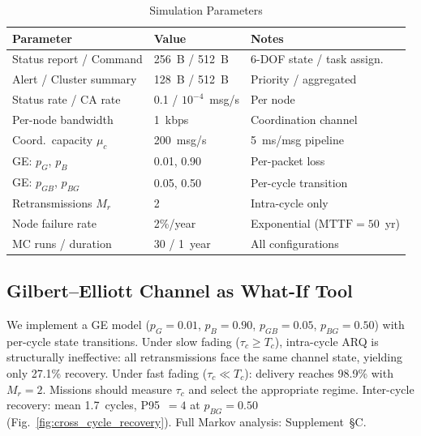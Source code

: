 \documentclass[journal]{IEEEtran}
\begin{document}
\begin{table}[t]
    \centering
    \caption{Simulation Parameters}
    \label{tab:sim_params}
    \footnotesize
    \begin{tabular}{@{}lll@{}}
        \toprule
        \textbf{Parameter} & \textbf{Value} & \textbf{Notes} \\
        \midrule
        Status report / Command & 256~B / 512~B & 6-DOF state / task assign. \\
        Alert / Cluster summary & 128~B / 512~B & Priority / aggregated \\
        Status rate / CA rate & 0.1 / $10^{-4}$~msg/s & Per node \\
        Per-node bandwidth & 1~kbps & Coordination channel \\
        Coord.\ capacity $\mu_c$ & 200~msg/s & 5~ms/msg pipeline \\
        \midrule
        GE: $p_G$, $p_B$ & 0.01, 0.90 & Per-packet loss \\
        GE: $p_{GB}$, $p_{BG}$ & 0.05, 0.50 & Per-cycle transition \\
        Retransmissions $M_r$ & 2 & Intra-cycle only \\
        \midrule
        Node failure rate & 2\%/year & Exponential ($\text{MTTF} = 50$~yr) \\
        MC runs / duration & 30 / 1~year & All configurations \\
        \bottomrule
    \end{tabular}
\end{table}

\subsection{Gilbert--Elliott Channel as What-If Tool}
\label{sec:ge_link}

We implement a GE model ($p_G = 0.01$, $p_B = 0.90$, $p_{GB} = 0.05$, $p_{BG} = 0.50$) with per-cycle state transitions. Under slow fading ($\tau_c \geq T_c$), intra-cycle ARQ is structurally ineffective: all retransmissions face the same channel state, yielding only 27.1\% recovery. Under fast fading ($\tau_c \ll T_c$): delivery reaches 98.9\% with $M_r = 2$. Missions should measure $\tau_c$ and select the appropriate regime. Inter-cycle recovery: mean 1.7~cycles, P95~$= 4$ at $p_{BG} = 0.50$ (Fig.~\ref{fig:cross_cycle_recovery}). Full Markov analysis: Supplement~\S C.

\end{document}
